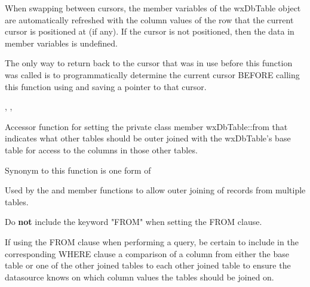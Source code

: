 
When swapping between cursors, the member variables of the wxDbTable object 
are automatically refreshed with the column values of the row that the 
current cursor is positioned at (if any).  If the cursor is not positioned, 
then the data in member variables is undefined.

The only way to return back to the cursor that was in use before this 
function was called is to programmatically determine the current cursor 
BEFORE calling this function using  
and saving a pointer to that cursor.


, , 


\label{wxdbtablesetfromclause}


Accessor function for setting the private class member wxDbTable::from 
that indicates what other tables should be outer joined with the wxDbTable's
base table for access to the columns in those other tables. 

Synonym to this function is one form of 




Used by the  and 
 member functions to allow outer 
joining of records from multiple tables.  

Do {\bf not} include the keyword "FROM" when setting the FROM clause.

If using the FROM clause when performing a query, be certain to include in 
the corresponding WHERE clause a comparison of a column from either the base 
table or one of the other joined tables to each other joined table to ensure 
the datasource knows on which column values the tables should be joined on.

